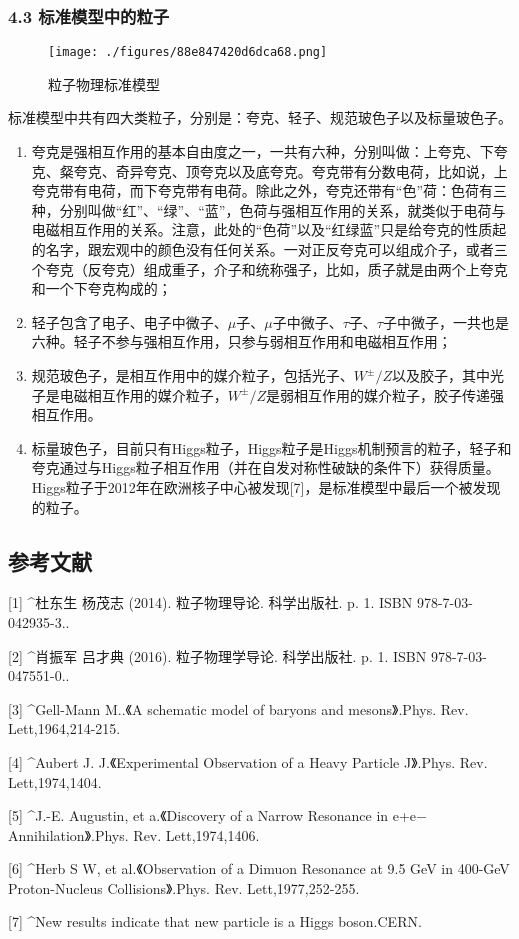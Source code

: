 \subsubsection{4.3 标准模型中的粒子}
\begin{figure}[ht]
\centering
\texttt{[image: ./figures/88e847420d6dca68.png]}
\caption{粒子物理标准模型} \label{fig_LZWLX_1}
\end{figure}
标准模型中共有四大类粒子，分别是：夸克、轻子、规范玻色子以及标量玻色子。
\begin{enumerate}
\item 夸克是强相互作用的基本自由度之一，一共有六种，分别叫做：上夸克、下夸克、粲夸克、奇异夸克、顶夸克以及底夸克。夸克带有分数电荷，比如说，上夸克带有电荷，而下夸克带有电荷。除此之外，夸克还带有“色”荷：色荷有三种，分别叫做“红”、“绿”、“蓝”，色荷与强相互作用的关系，就类似于电荷与电磁相互作用的关系。注意，此处的“色荷”以及“红绿蓝”只是给夸克的性质起的名字，跟宏观中的颜色没有任何关系。一对正反夸克可以组成介子，或者三个夸克（反夸克）组成重子，介子和统称强子，比如，质子就是由两个上夸克和一个下夸克构成的；
\item 轻子包含了电子、电子中微子、$\mu$子、$\mu$子中微子、$\tau$子、$\tau$子中微子，一共也是六种。轻子不参与强相互作用，只参与弱相互作用和电磁相互作用；
\item 规范玻色子，是相互作用中的媒介粒子，包括光子、$W^\pm/Z$以及胶子，其中光子是电磁相互作用的媒介粒子，$W^\pm/Z$是弱相互作用的媒介粒子，胶子传递强相互作用。
\item 标量玻色子，目前只有Higgs粒子，Higgs粒子是Higgs机制预言的粒子，轻子和夸克通过与Higgs粒子相互作用（并在自发对称性破缺的条件下）获得质量。Higgs粒子于2012年在欧洲核子中心被发现[7]，是标准模型中最后一个被发现的粒子。
\end{enumerate}

\subsection{参考文献}
[1]
^杜东生 杨茂志 (2014). 粒子物理导论. 科学出版社. p. 1. ISBN 978-7-03-042935-3..

[2]
^肖振军 吕才典 (2016). 粒子物理学导论. 科学出版社. p. 1. ISBN 978-7-03-047551-0..

[3]
^Gell-Mann M..《A schematic model of baryons and mesons》.Phys. Rev. Lett,1964,214-215.

[4]
^Aubert J. J.《Experimental Observation of a Heavy Particle J》.Phys. Rev. Lett,1974,1404.

[5]
^J.-E. Augustin, et a.《Discovery of a Narrow Resonance in e+e− Annihilation》.Phys. Rev. Lett,1974,1406.

[6]
^Herb S W, et al.《Observation of a Dimuon Resonance at 9.5 GeV in 400-GeV Proton-Nucleus Collisions》.Phys. Rev. Lett,1977,252-255.

[7]
^New results indicate that new particle is a Higgs boson.CERN.